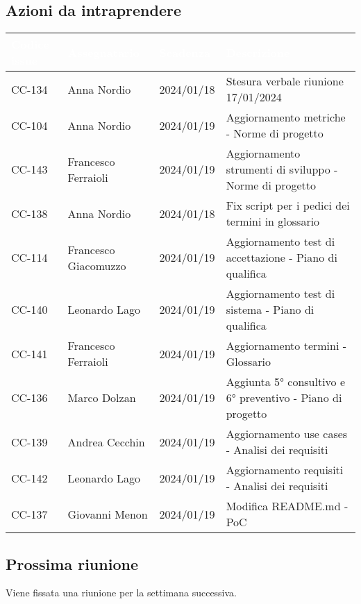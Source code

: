 \subsection{Azioni da intraprendere}
{
    \setlength{\tabcolsep}{10pt}
            \renewcommand{\arraystretch}{1.5}
            \begin{xltabular}{\textwidth}{| l | l | l | X |}
                 \hline
                 \textbf{\textcolor{white}{Codice issue}} & \textbf{\textcolor{white}{Assegnatario}} & \textbf{\textcolor{white}{Scadenza}} & \textbf{\textcolor{white}{Descrizione}} \\
                 \hline
                 CC-134 & Anna Nordio & 2024/01/18 & Stesura verbale riunione 17/01/2024 \\
                 \hline
                 CC-104 & Anna Nordio & 2024/01/19 & Aggiornamento metriche - Norme di progetto\\
                 \hline
                 CC-143 & Francesco Ferraioli & 2024/01/19 & Aggiornamento strumenti di sviluppo - Norme di progetto\\
                 \hline
                 CC-138 & Anna Nordio & 2024/01/18 & Fix script per i pedici dei termini in glossario \\
                 \hline
                 CC-114 & Francesco Giacomuzzo & 2024/01/19 & Aggiornamento test di accettazione - Piano di qualifica \\
                 \hline
                 CC-140 & Leonardo Lago & 2024/01/19 & Aggiornamento test di sistema - Piano di qualifica \\
                 \hline
                 CC-141 & Francesco Ferraioli & 2024/01/19 & Aggiornamento termini - Glossario \\
                 \hline
                 CC-136 & Marco Dolzan & 2024/01/19 & Aggiunta 5° consultivo e 6° preventivo - Piano di progetto \\
                 \hline
                 CC-139 & Andrea Cecchin & 2024/01/19 & Aggiornamento use cases - Analisi dei requisiti \\
                 \hline
                 CC-142 & Leonardo Lago & 2024/01/19 & Aggiornamento requisiti - Analisi dei requisiti \\
                 \hline
                 CC-137 & Giovanni Menon & 2024/01/19 & Modifica README.md - PoC \\
                 \hline
            \end{xltabular}
}


\subsection{Prossima riunione} \label{subsec:riunione}
Viene fissata una riunione per la settimana successiva.
